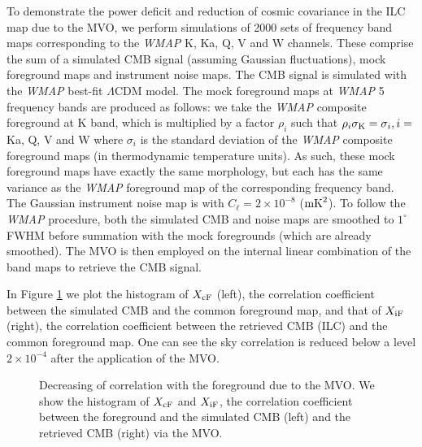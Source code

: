 \documentclass{emulateapj}
\def\cmb{{\rm c}}
\def\fg{{\rm F}}
\def\wmap{{\sl WMAP }}
\def\l{{\ell}}
\def\xcf{{X_{\cmb \fg}}}
\def\cl{C_{\l}}
\begin{document}
To demonstrate the power deficit and reduction of cosmic covariance
in the ILC map due to the MVO, we perform simulations of 2000 sets
of frequency band maps corresponding to the \wmap K, Ka, Q, V and W
channels. These comprise the sum of a simulated CMB signal (assuming
Gaussian fluctuations), mock foreground maps and instrument noise
maps. The CMB signal is simulated with the \wmap best-fit
$\Lambda$CDM model. The mock foreground maps at \wmap 5 frequency
bands are produced as follows: we take the \wmap composite
foreground at K band, which is multiplied by a factor
$\rho_i$ such that $\rho_i \sigma_{\rm K}= \sigma_i, i= $ Ka, Q, V
and W where $\sigma_i$ is the standard deviation of the \wmap
composite foreground maps (in thermodynamic temperature units). As
such, these mock foreground maps have exactly the same morphology,
but each has the same variance as the \wmap foreground map of the
corresponding frequency band. The Gaussian instrument noise map is
with $\cl= 2 \times 10^{-8}$ (${\rm mK}^2$). To follow the \wmap procedure, both the simulated CMB and noise maps are smoothed to $1^\circ$ FWHM before summation with the mock foregrounds (which are already smoothed). The MVO is then employed on the internal
linear combination of the band maps to retrieve the CMB signal.

In Figure \ref{xcorr} we plot the histogram of $\xcf$ (left), the
correlation coefficient between the simulated CMB and the common foreground
map, and that of $X_{\rm iF}$ (right), the correlation coefficient
between the retrieved CMB (ILC) and the common foreground map. One can see
the sky correlation is reduced below a level $2 \times 10^{-4}$
after the application of the MVO.


\begin{figure}
\caption{Decreasing of correlation with the foreground due to the MVO. We show the histogram of $X_{\rm cF}$ and $X_{\rm iF}$, the correlation coefficient between the foreground and the simulated CMB (left) and the retrieved CMB (right) via the MVO.}
\label{xcorr}
\end{figure}
\end{document}
